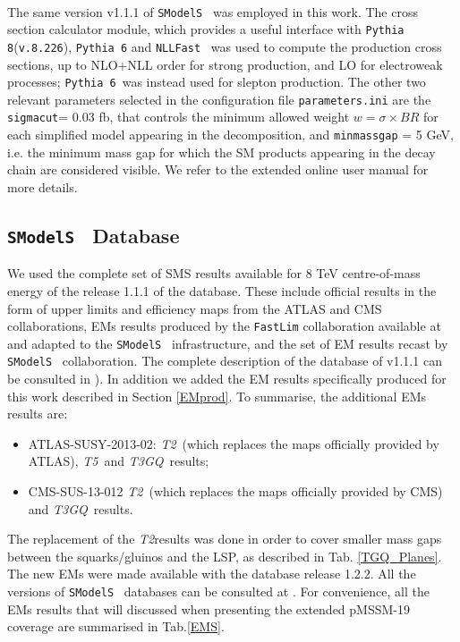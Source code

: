 \documentclass[a4paper,11pt]{article}
\newcommand{\SMO}{\texttt{SModelS\xspace}}
\newcommand{\TGQ}{ \textit{T3GQ}}
\newcommand{\Ttwo}{ \textit{T2}}
\newcommand{\Tfive}{ \textit{T5}}
\begin{document}
\\
The same version v1.1.1 of \SMO~ was employed in this work. The cross section calculator module, which provides a useful interface with \texttt{Pythia 8}(\texttt{v.8.226})\cite{Sjostrand:2014zea}, \texttt{Pythia 6}\cite{Sjostrand:2006za} and \texttt{NLLFast}~\cite{nllfast,Beenakker:1996ch,Kulesza:2008jb,Kulesza:2009kq,Beenakker:2009ha,Beenakker:2011fu,Beenakker:1997ut,Beenakker:2010nq} was used to compute the production cross sections, up to NLO+NLL order for strong production, and LO for electroweak processes; \texttt{Pythia 6}~was instead used for slepton production. The other two relevant parameters selected in the configuration file \texttt{parameters.ini} are the \texttt{sigmacut}= 0.03 fb, that controls the  minimum allowed weight  $w = \sigma \times BR$ for each simplified model appearing in the decomposition, and \verb|minmassgap| = 5 GeV, i.e. the minimum mass gap for which the SM products appearing in the decay chain are considered visible. We refer to the extended online user manual\cite{SMOMANUAL} for more details.  
%
\subsection{\SMO~ Database}
We used the complete set of SMS results available for 8 TeV centre-of-mass energy of the release 1.1.1 of the database. These include official results in the form of upper limits and efficiency maps from the ATLAS and CMS collaborations, EMs results produced by the \texttt{FastLim} collaboration available at \cite{fastlim:web} and adapted to the \SMO~ infrastructure, and the set of EM results recast by \SMO~ collaboration. The complete description of the database of v1.1.1 can be consulted in \cite{Ambrogi:2017lov}). In addition we added the EM results specifically produced for this work described in Section \ref{EMprod}. To summarise, the additional EMs results are:
\begin{itemize}
	\item ATLAS-SUSY-2013-02: \Ttwo~(which replaces the maps officially provided by ATLAS), \Tfive~and \TGQ~results; \
	\item CMS-SUS-13-012 \Ttwo~(which replaces the maps officially provided by CMS) and \TGQ~results.
\end{itemize}


The replacement of the \Ttwo results was done in order to cover smaller mass gaps between the squarks/gluinos and the LSP, as described in Tab. \ref{TGQ_Planes}. The new EMs were made available with the database release 1.2.2. All the versions of \SMO~ databases can be consulted at \cite{databases}. For convenience, all the EMs results that will discussed when presenting the extended pMSSM-19 coverage are summarised in Tab.\ref{EMS}.
\end{document}

